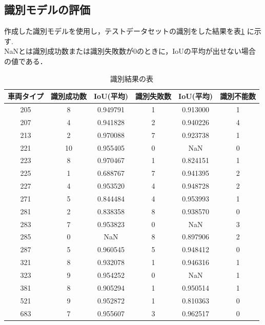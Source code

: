 \subsection{識別モデルの評価}
作成した識別モデルを使用し，テストデータセットの識別をした結果を表\ref{tab:identification_results} に示す.\\
NaNとは識別成功数または識別失敗数が0のときに，IoUの平均が出せない場合の値である．\\
\begin{table}[htbp] 
	\centering
	\begin{tabular}{cccccc}
		\hline
		車両タイプ & 識別成功数 & IoU(平均) & 識別失敗数 & IoU(平均) & 識別不能数 \\
		\hline \hline
		\hline
		205 & 8 & 0.949791 & 1 & 0.913000 & 1 \\
		207 & 4 & 0.941828 & 2 & 0.940226 & 4 \\
		213 & 2 & 0.970088 & 7 & 0.923738 & 1 \\
		221 & 10 & 0.955405 & 0 & NaN & 0 \\
		223 & 8 & 0.970467 & 1 & 0.824151 & 1 \\
		225 & 1 & 0.688767 & 7 & 0.941395 & 2 \\
		227 & 4 & 0.953520 & 4 & 0.948728 & 2 \\
		271 & 5 & 0.844484 & 4 & 0.953993 & 1 \\
		281 & 2 & 0.838358 & 8 & 0.938570 & 0 \\
		283 & 7 & 0.953823 & 0 & NaN & 3 \\
		285 & 0 & NaN & 8 & 0.897906 & 2 \\
		287 & 5 & 0.960545 & 5 & 0.948412 & 0 \\
		321 & 8 & 0.932078 & 1 & 0.946316 & 1 \\
		323 & 9 & 0.954252 & 0 & NaN & 1 \\
		381 & 8 & 0.905294 & 1 & 0.950514 & 1 \\
		521 & 9 & 0.952872 & 1 & 0.810363 & 0 \\
		683 & 7 & 0.955607 & 3 & 0.962517 & 0 \\
		\hline
	\end{tabular}
	\caption{識別結果の表}
	\label{tab:identification_results}
\end{table}

